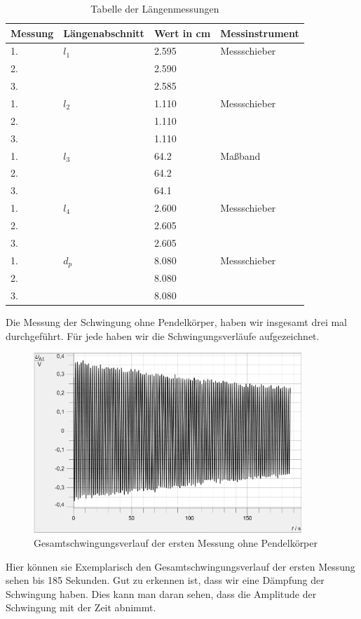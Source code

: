 \documentclass[twoside]{protokoll}
\begin{document}
\begin{table}[H]
        \centering
        \begin{tabularx}{1.0\textwidth}{X l X X} %
            \toprule
            \textbf{Messung} & \textbf{Längenabschnitt} & \textbf{Wert in cm} & \textbf{Messinstrument} \\
            \midrule
            1. & $l_1$ & 2.595 & Messschieber \\
            2. & & 2.590 &\\ 
            3. & & 2.585 &\\
            \midrule
            1. & $l_2$ & 1.110 & Messschieber \\
            2. & & 1.110 &\\
            3. & & 1.110 &\\
            \midrule
            1. & $l_3$ & 64.2 & Maßband \\
            2. & & 64.2 &\\
            3. & & 64.1 &\\
            \midrule
            1. & $l_4$ & 2.600 & Messschieber \\
            2. & & 2.605 &\\
            3. & & 2.605 &\\
            \midrule
            1. & $d_p$ & 8.080 & Messschieber \\
            2. & & 8.080 &\\
            3. & & 8.080 &\\
            \bottomrule
        \end{tabularx}
        \caption{Tabelle der Längenmessungen}
        \label{tab:längen}
    \end{table}
     
Die Messung der Schwingung ohne Pendelkörper, haben wir insgesamt drei mal durchgeführt.
Für jede haben wir die Schwingungsverläufe aufgezeichnet.
\begin{figure}[H]
    \centering
    \includegraphics[width=0.9\textwidth]{plots/stange-1-komplett.pdf}
    \caption{Gesamtschwingungsverlauf der ersten Messung ohne Pendelkörper}
\end{figure}
Hier können sie Exemplarisch den Gesamtschwingungsverlauf der ersten Messung sehen bis 185 Sekunden.
Gut zu erkennen ist, dass wir eine Dämpfung der Schwingung haben.
Dies kann man daran sehen, dass die Amplitude der Schwingung mit der Zeit abnimmt. 
\end{document}
